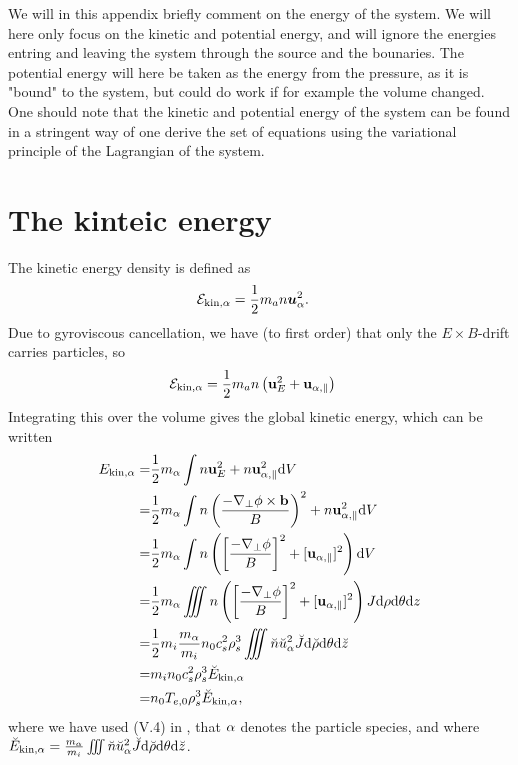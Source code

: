 We will in this appendix briefly comment on the energy of the system.
We will here only focus on the kinetic and potential energy, and will ignore the energies entring and leaving the system through the source and the bounaries.
The potential energy will here be taken as the energy from the pressure, as it is "bound" to the system, but could do work if for example the volume changed.
One should note that the kinetic and potential energy of the system can be found in a stringent way of one derive the set of equations using the variational principle of the Lagrangian of the system.

\section{The kinteic energy}
%
The kinetic energy density is defined as
%
\begin{align*}
    \mathcal{E}_{\text{kin},\alpha} &= \frac{1}{2}m_an \boldsymbol{u}^2_\alpha.
\end{align*}
%
Due to gyroviscous cancellation, we have (to first order) that only the $E\times B$-drift carries particles, so
%
\begin{align*}
    \mathcal{E}_{\text{kin},\alpha} &= \frac{1}{2}m_an \left(\mathbf{u}_E^2 + \mathbf{u}_{\alpha,\parallel}\right)
\end{align*}
%
Integrating this over the volume gives the global kinetic energy, which can be written
%
\begin{align*}
    E_{\text{kin},\alpha}
    =& \frac{1}{2}m_{\alpha}\int
       n\mathbf{u}_E^2
       + n\mathbf{u}_{\alpha,\parallel}^2 \text{d} V
     \\
    =& \frac{1}{2}m_{\alpha}\int
       n\left(\frac{-\nabla_\perp\phi
              \times\mathbf{b}}{B}\right)^2
       + n\mathbf{u}_{\alpha,\parallel}^2 \text{d} V
    \\
    =& \frac{1}{2}m_{\alpha}\int
       n\left(\left[\frac{-\nabla_\perp\phi}{B}\right]^2
       + [\mathbf{u}_{\alpha,\parallel}]^2\right) \text{d} V
   \\
    =& \frac{1}{2}m_{\alpha}\iiint
       n\left(\left[\frac{-\nabla_\perp\phi}{B}\right]^2
       + [\mathbf{u}_{\alpha,\parallel}]^2\right)
       J \text{d}\rho \text{d}\theta \text{d} z
    \\
    =& \frac{1}{2}m_i\frac{m_{\alpha}}{m_i}
       n_0c_s^2\rho_s^3
       \iiint
       \breve{n}\breve{u}_\alpha^2
       \breve{J} \text{d} \breve{\rho} \text{d}\theta \text{d} \breve{z}
    \\
    =& m_in_0c_s^2\rho_s^3 \breve{E}_{\text{kin},\alpha}
    \\
    =& n_0T_{e,0}\rho_s^3 \breve{E}_{\text{kin},\alpha},
\end{align*}
%
where we have used (V.4) in \cite{Dhaeseleer1991book}, that $\alpha$ denotes the particle species, and where $\breve{E}_{\text{kin},\alpha} = \frac{m_{\alpha}}{m_i}\iiint \breve{n}\breve{u}_\alpha^2 \breve{J} \text{d} \breve{\rho} \text{d}\theta \text{d} \breve{z}$.

